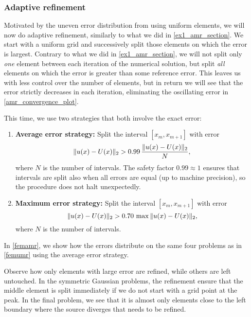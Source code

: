 \subsubsection{Adaptive refinement}
\label{fem_amr_section}

Motivated by the uneven error distribution from using uniform elements, we will now do adaptive refinement, similarly to what we did in \cref{ex1_amr_section}.
We start with a uniform grid and successively split those elements on which the error is largest.
Contrary to what we did in \cref{ex1_amr_section}, we will not split only \emph{one} element between each iteration of the numerical solution, but split \emph{all} elements on which the error is greater than some reference error.
This leaves us with less control over the number of elements, but in return we will see that the error strictly decreases in each iteration, eliminating the oscillating error in \cref{amr_convergence_plot}.

This time, we use two strategies that both involve the exact error:
\begin{enumerate}
\item \textbf{Average error strategy:} Split the interval $[x_m, x_{m+1}]$ with error 
\begin{equation*}
\Vert u(x)-U(x) \Vert_2 > 0.99 \, \dfrac{\Vert u(x)-U(x) \Vert_2}{N},
\end{equation*}
where $N$ is the number of intervals.
The safety factor $0.99 \approx 1$ ensures that intervals are split also when all errors are equal (up to machine precision), so the procedure does not halt unexpectedly.
\item \textbf{Maximum error strategy:} Split the interval $[x_m, x_{m+1}]$ with error
\begin{equation*}
\Vert u(x)-U(x) \Vert_2 > 0.70 \, \max{\Vert u(x)-U(x) \Vert_2},
\end{equation*}
where $N$ is the number of intervals.
\end{enumerate}

In \cref{femamr}, we show how the errors distribute on the same four problems as in \cref{femumr} using the average error strategy.

Observe how only elements with large error are refined, while others are left untouched.
In the symmetric Gaussian problems, the refinement ensure that the middle element is split immediately if we do not start with a grid point at the peak.
In the final problem, we see that it is almost only elements close to the left boundary where the source diverges that needs to be refined.

